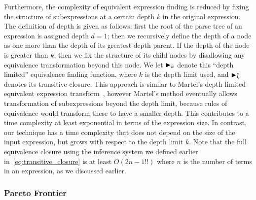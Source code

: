 Furthermore, the complexity of equivalent expression finding is reduced
by fixing the structure of subexpressions at a certain depth $k$ in the
original expression.  The definition of depth is given as follows: first
the root of the parse tree of an expression is assigned depth $d = 1$; then
we recursively define the depth of a node as one more than the depth of
its greatest-depth parent.  If the depth of the node is greater than $k$,
then we fix the structure of its child nodes by disallowing any equivalence
transformation beyond this node. We let $\operatorname{\blacktriangleright}_k$ denote this ``depth
limited'' equivalence finding function, where $k$ is the depth limit used, and
$\operatorname{\blacktriangleright}^\star_k$ denotes its transitive closure. This approach is similar to
Martel's depth limited equivalent expression transform~\cite{martel07}, however
Martel's method eventually allows transformation of subexpressions beyond the
depth limit, because rules of equivalence would transform these to have a
smaller depth.  This contributes to a time complexity at least exponential in
terms of the expression size. In contrast, our technique has a time complexity
that does not depend on the size of the input expression, but grows with
respect to the depth limit $k$. Note that the full equivalence closure using
the inference system we defined earlier in~\eqref{eq:transitive_closure} is at
least $O({2n - 1}!!)$ where $n$ is the number of terms in an expression, as we
discussed earlier.

\subsubsection{Pareto Frontier}


